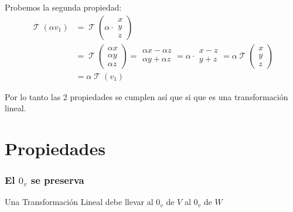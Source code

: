\documentclass[12pt]{report}                                %
\DeclareMathOperator \LinealTransformation {\mathcal{T}}
\begin{document}
            Probemos la segunda propiedad:
            \begin{equation*}
            \begin{split}
                \LinealTransformation (\alpha v_1) & =
                \LinealTransformation \left( \alpha \cdot \begin{matrix} x\\y\\z \end{matrix} \right) \\
                & = \LinealTransformation \left( \begin{matrix} \alpha x\\ \alpha y\\ \alpha z\end{matrix} \right) =
                \begin{matrix} \alpha x - \alpha z\\ \alpha y + \alpha z\end{matrix}  =
                \alpha \cdot \begin{matrix}x-z\\y+z\end{matrix} =
                \alpha \LinealTransformation \left( \begin{matrix}x\\y\\z\end{matrix} \right) \\
                & = \alpha \LinealTransformation(v_1)
            \end{split}
            \end{equation*}

        Por lo tanto las 2 propiedades se cumplen así que si que es una transformación lineal.


    \clearpage
    \section{Propiedades}

        \subsubsection{El $0_v$ se preserva}
            Una Transformación Lineal debe llevar al $0_v$ de $V$ al $0_v$ de $W$
\end{document}
